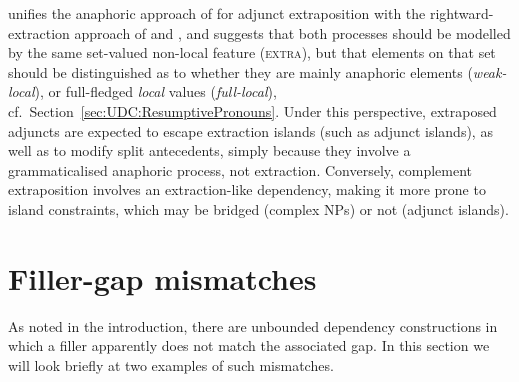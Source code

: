 \documentclass[output=paper
                ,modfonts
                ,nonflat
	        ,collection
	        ,collectionchapter
	        ,collectiontoclongg
 	        ,biblatex
                ,babelshorthands
                ,newtxmath
                ,draftmode
                ,colorlinks, citecolor=brown
]{./langsci/langscibook}
\begin{document}
{\begin{exe}
\ex
\begin{xlist}
\end{xlist}
\end{exe}


\citet{crysmann_b09xtra} unifies the anaphoric approach of
\citet{kiss_t02nllt} for adjunct extraposition with the
rightward-extraction approach of \citet{Keller:95} and
\cite{Mueller99a}, and suggests that both processes should be modelled
by the same set-valued non-local feature (\textsc{extra}), but that
elements on that set should be distinguished as to whether they are
mainly anaphoric elements (\textit{weak-local}), or full-fledged
\textit{local} values (\textit{full-local}), cf.\
Section~\ref{sec:UDC:ResumptivePronouns}.  Under this perspective,
extraposed adjuncts are expected to escape extraction islands (such as
adjunct islands), as well as to modify split antecedents, simply
because they involve a grammaticalised anaphoric process, not
extraction. Conversely, complement extraposition involves an
extraction-like dependency, making it more prone to island
constraints, which may be bridged (complex NPs) or not (adjunct
islands).




\section{Filler-gap mismatches}
\label{sec:UDC:FillerGapMismatches}

As noted in the introduction, there are unbounded dependency
constructions in which a filler apparently does not match the
associated gap. In this section we will look briefly at two examples
of such mismatches.

}
\end{document}
